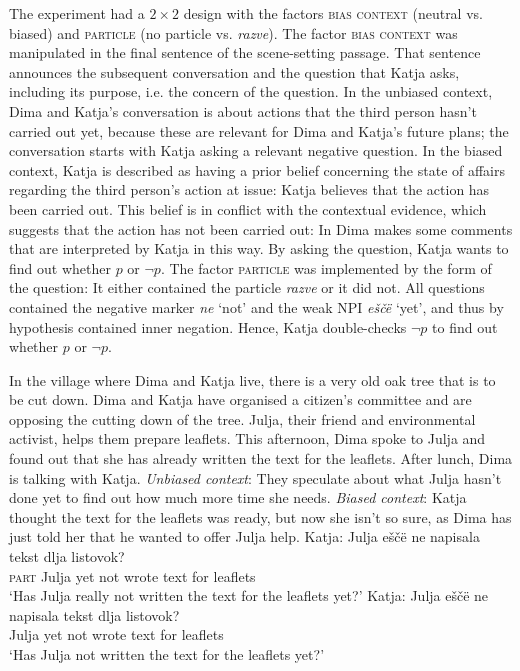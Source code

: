 \documentclass[output=paper,colorlinks,citecolor=brown]{langscibook}
\begin{document}
The experiment had a $2 \times 2$ design with the factors \textsc{bias context} (neutral vs. biased) and \textsc{particle} (no particle vs. \textit{razve}). The factor \textsc{bias context} was manipulated in the final sentence of the scene-setting passage. That sentence announces the subsequent conversation and the question that Katja asks, including its purpose, i.e. the concern of the question. In the unbiased context, Dima and Katja's conversation is about actions that the third person hasn't carried out yet, because these are relevant for Dima and Katja's future plans; the conversation starts with Katja asking a relevant negative question. In the biased context, Katja is described as having a prior belief concerning the state of affairs regarding the third person's action at issue: Katja believes that the action has been carried out. This belief is in conflict with the contextual evidence, which suggests that the action has not been carried out: In  Dima makes some comments that are interpreted by Katja in this way. By asking the question, Katja wants to find out whether $p$ or $\neg p$. The factor \textsc{particle} was implemented by the form of the question: It either contained the particle \textit{razve} or it did not. All questions contained the negative marker \textit{ne} `not' and the weak NPI \textit{eščë} `yet', and thus by hypothesis contained inner negation. Hence, Katja double-checks $\neg p$ to find out whether $p$ or $\neg p$.

\ea \label{16}
In the village where Dima and Katja live, there is a very old oak tree that is to be cut down. Dima and Katja have organised a citizen's committee and are opposing the cutting down of the tree. Julja, their friend and environmental activist, helps them prepare leaflets. This afternoon, Dima spoke to Julja and found out that she has already written the text for the leaflets. After lunch, Dima is talking with Katja.
\sn 
\textit{Unbiased context}: They speculate about what Julja hasn't done yet to find out how much more time she needs.
\sn
\textit{Biased context}: Katja thought the text for the leaflets was ready, but now she isn't so sure, as Dima has just told her that he wanted to offer Julja help.
\ea Katja:  Julja {eščë} {ne} {napisala} {tekst} {dlja} {{listovok?}}\\
{\textsc{part}} Julja {yet} {not} {wrote} {text} {for} {leaflets}\\ \jambox*{[+particle]}
\glt \phantom{Katja:} `Has Julja really not written the text for the leaflets yet?'
\ex Katja: \gll Julja {{eščë}} {{ne}} {{napisala}} {{tekst}} {{dlja}} {{listovok?}}\\
Julja {yet} {not} {wrote} {text} {for} {leaflets}\\ \jambox*{[-particle]}
\glt \phantom{Katja:} `Has Julja not written the text for the leaflets yet?'
\z
\z
\end{document}
